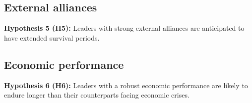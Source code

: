\documentclass[
  12pt,
  a4paper,
  12pt]{article}
\begin{document}
\hypertarget{external-alliances}{%
\subsection{External alliances}\label{external-alliances}}

\textbf{Hypothesis 5 (H5):} Leaders with strong external alliances are
anticipated to have extended survival periods.

\hypertarget{economic-performance}{%
\subsection{Economic performance}\label{economic-performance}}

\textbf{Hypothesis 6 (H6):} Leaders with a robust economic performance
are likely to endure longer than their counterparts facing economic
crises.

\newpage


\renewcommand\refname{References}
  
\end{document}
